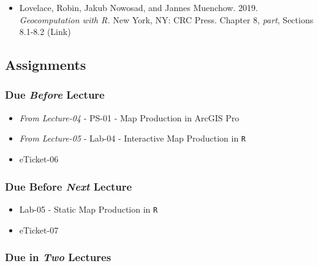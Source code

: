 \documentclass[
]{book}
\providecommand{\tightlist}{%
  \setlength{\itemsep}{0pt}\setlength{\parskip}{0pt}}
\begin{document}
\begin{itemize}
\tightlist
\item
  Lovelace, Robin, Jakub Nowosad, and Jannes Muenchow. 2019. \emph{Geocomputation with R.} New York, NY: CRC Press. Chapter 8, \emph{part}, Sections 8.1-8.2 (Link)
\end{itemize}

\hypertarget{assignments-7}{%
\subsection*{Assignments}\label{assignments-7}}

\hypertarget{due-before-lecture-5}{%
\subsubsection*{\texorpdfstring{Due \emph{Before} Lecture}{Due Before Lecture}}\label{due-before-lecture-5}}

\begin{itemize}
\tightlist
\item
  \emph{From Lecture-04} - PS-01 - Map Production in ArcGIS Pro
\item
  \emph{From Lecture-05} - Lab-04 - Interactive Map Production in \texttt{R}
\item
  eTicket-06
\end{itemize}

\hypertarget{due-before-next-lecture-4}{%
\subsubsection*{\texorpdfstring{Due Before \emph{Next} Lecture}{Due Before Next Lecture}}\label{due-before-next-lecture-4}}

\begin{itemize}
\tightlist
\item
  Lab-05 - Static Map Production in \texttt{R}
\item
  eTicket-07
\end{itemize}

\hypertarget{due-in-two-lectures-2}{%
\subsubsection*{\texorpdfstring{Due in \emph{Two} Lectures}{Due in Two Lectures}}\label{due-in-two-lectures-2}}
\end{document}
